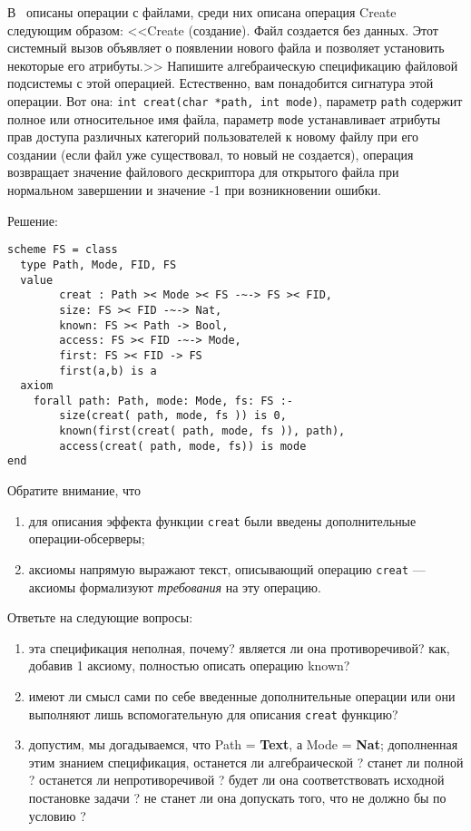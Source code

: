 
\z В~\cite{tanenbaum_os} описаны операции с файлами, среди них описана операция Create следующим образом: <<\textsf{Create} (создание). Файл создается без данных. Этот системный вызов объявляет о появлении нового файла и позволяет установить некоторые его атрибуты.>> Напишите алгебраическую спецификацию файловой подсистемы с этой операцией. Естественно, вам понадобится сигнатура этой операции. Вот она:  \texttt{int creat(char *path, int mode)}, параметр \texttt{path} содержит полное или относительное имя файла, параметр \texttt{mode} устанавливает атрибуты прав доступа различных категорий пользователей к новому файлу при его создании (если файл уже существовал, то новый не создается), операция возвращает значение файлового дескриптора для открытого файла при нормальном завершении и значение -1 при возникновении ошибки.

Решение:
\begin{lstlisting}
scheme FS = class
  type Path, Mode, FID, FS
  value
        creat : Path >< Mode >< FS -~-> FS >< FID,
        size: FS >< FID -~-> Nat,
        known: FS >< Path -> Bool,
        access: FS >< FID -~-> Mode,
        first: FS >< FID -> FS
        first(a,b) is a
  axiom
    forall path: Path, mode: Mode, fs: FS :-
        size(creat( path, mode, fs )) is 0,
        known(first(creat( path, mode, fs )), path),
        access(creat( path, mode, fs)) is mode
end
\end{lstlisting}
Обратите внимание, что
\begin{enumerate}
  \item для описания эффекта функции \texttt{creat} были введены дополнительные операции-обсерверы;
  \item аксиомы напрямую выражают текст, описывающий операцию \texttt{creat} --- аксиомы формализуют \emph{требования} на эту операцию.
\end{enumerate}
Ответьте на следующие вопросы:
\begin{enumerate}
  \item эта спецификация неполная, почему? является ли она противоречивой? как, добавив 1 аксиому, полностью описать операцию known?
  \item имеют ли смысл сами по себе введенные дополнительные операции или они выполняют лишь вспомогательную для описания \texttt{creat} функцию?
  \item допустим, мы догадываемся, что Path = \textbf{Text}, а Mode = \textbf{Nat}; дополненная этим знанием спецификация, останется ли алгебраической ? станет ли полной ? останется ли непротиворечивой ? будет ли она соответствовать исходной постановке задачи ? не станет ли она допускать того, что не должно бы по условию ?
\end{enumerate}

